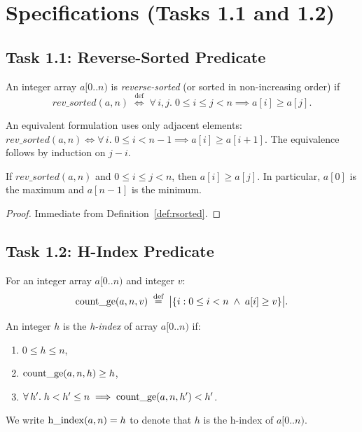 \section{Specifications (Tasks 1.1 and 1.2)}
\label{sec:specifications}

\subsection{Task 1.1: Reverse-Sorted Predicate}

\begin{definition}\label{def:rsorted}
An integer array $a[0..n)$ is \emph{reverse-sorted} (or sorted in non-increasing order) if
\[
  \mathit{rev\_sorted}(a, n) \;\stackrel{\text{def}}{\iff}\;
  \forall\, i,j.\; 0 \leq i \leq j < n \implies a[i] \geq a[j].
\]
\end{definition}

\begin{remark}
An equivalent formulation uses only adjacent elements:
$\mathit{rev\_sorted}(a,n) \iff \forall\, i.\; 0 \leq i < n{-}1 \implies a[i] \geq a[i{+}1]$.
The equivalence follows by induction on $j - i$.
\end{remark}

\begin{lemma}\label{lem:mono}
If $\mathit{rev\_sorted}(a,n)$ and $0 \leq i \leq j < n$, then $a[i] \geq a[j]$.
In particular, $a[0]$ is the maximum and $a[n{-}1]$ is the minimum.
\end{lemma}
\begin{proof}
Immediate from Definition~\ref{def:rsorted}.
\end{proof}

\subsection{Task 1.2: H-Index Predicate}

\begin{definition}\label{def:countge}
For an integer array $a[0..n)$ and integer $v$:
\[
  \operatorname{count\_ge}(a, n, v) \;\stackrel{\text{def}}{=}\;
  \bigl|\{i : 0 \leq i < n \;\wedge\; a[i] \geq v\}\bigr|.
\]
\end{definition}

\begin{definition}[H-index]\label{def:hindex}
An integer $h$ is the \emph{h-index} of array $a[0..n)$ if:
\begin{enumerate}[label=(H\arabic*)]
  \item\label{h:range} $0 \leq h \leq n$,
  \item\label{h:lower} $\operatorname{count\_ge}(a, n, h) \geq h$,
  \item\label{h:upper} $\forall\, h'.\; h < h' \leq n \implies \operatorname{count\_ge}(a, n, h') < h'$.
\end{enumerate}
We write $\operatorname{h\_index}(a, n) = h$ to denote that $h$ is the h-index of $a[0..n)$.
\end{definition}

